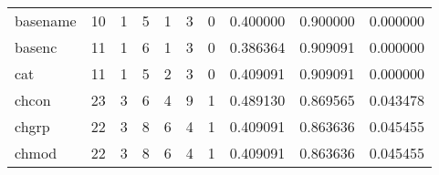 \begin{tabular}{lrrrrrrrrr}
basename  &                                       10 &                                                  1 &                                                  5 &                                                  1 &                                                  3 &                                                  0 &                                           0.400000 &                               0.900000 &                             0.000000 \\
basenc    &                                       11 &                                                  1 &                                                  6 &                                                  1 &                                                  3 &                                                  0 &                                           0.386364 &                               0.909091 &                             0.000000 \\
cat       &                                       11 &                                                  1 &                                                  5 &                                                  2 &                                                  3 &                                                  0 &                                           0.409091 &                               0.909091 &                             0.000000 \\
chcon     &                                       23 &                                                  3 &                                                  6 &                                                  4 &                                                  9 &                                                  1 &                                           0.489130 &                               0.869565 &                             0.043478 \\
chgrp     &                                       22 &                                                  3 &                                                  8 &                                                  6 &                                                  4 &                                                  1 &                                           0.409091 &                               0.863636 &                             0.045455 \\
chmod     &                                       22 &                                                  3 &                                                  8 &                                                  6 &                                                  4 &                                                  1 &                                           0.409091 &                               0.863636 &                             0.045455 \\

\end{tabular}

